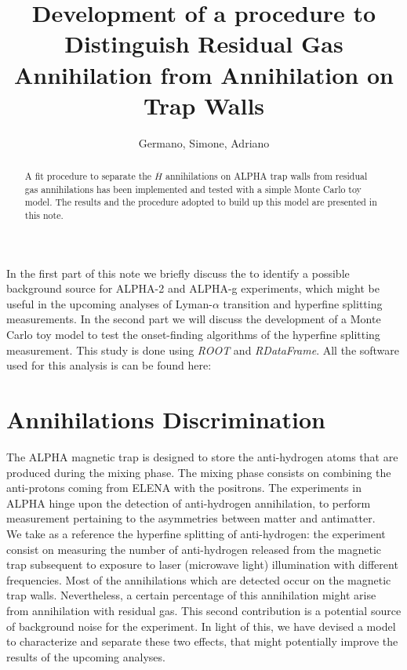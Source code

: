 \documentclass[11pt,a4paper,oneside]{article}
\title{%
 \vspace{-2.0cm}
 Development of a procedure to Distinguish Residual Gas Annihilation from Annihilation on Trap Walls
}
\date{\vspace{-5ex}}
\author{Germano, Simone, Adriano}
\begin{document}

\maketitle
\begin{abstract}
\centering
A fit procedure to separate the $\overline{H}$ annihilations on ALPHA trap walls from residual gas annihilations has been implemented and tested with a simple Monte Carlo toy model. The results and the procedure adopted to build up this model are presented in this note.
\end{abstract}


In the first part of this note we briefly discuss  the to identify a possible background source for ALPHA-2 and ALPHA-g experiments, which might be useful in the upcoming analyses of Lyman-$\alpha$ transition  and hyperfine splitting measurements. In the second part we will discuss the development of a Monte Carlo toy model to test the onset-finding algorithms of the hyperfine splitting measurement.
This study is done using \textit{ROOT} and \textit{RDataFrame}. All the software used for this analysis is can be found here: {}

\section*{Annihilations Discrimination}

The ALPHA magnetic trap is designed to store the anti-hydrogen atoms that are produced during the mixing phase. The mixing phase consists on combining the anti-protons coming from ELENA with the positrons. 
The experiments in ALPHA hinge upon the detection of anti-hydrogen annihilation, to perform measurement pertaining to the asymmetries between matter and antimatter.\\
We take as a reference the hyperfine splitting of anti-hydrogen: the experiment consist on measuring the number of anti-hydrogen released from the magnetic trap subsequent to exposure to laser (microwave light) illumination with different frequencies. Most of the annihilations which are detected occur on the magnetic trap walls. Nevertheless, a certain percentage of this annihilation might arise from annihilation with residual gas. This second contribution is a potential source of background noise for the experiment. In light of this, we have devised a model to characterize and separate these two effects, that might potentially improve the results of the upcoming analyses.
\end{document}
